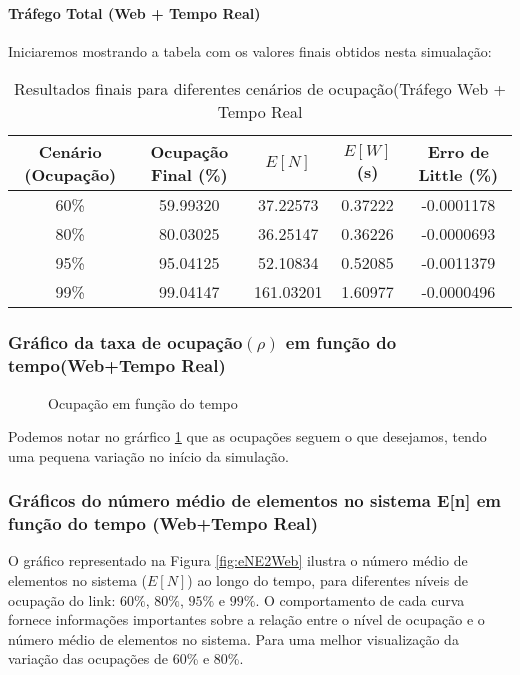 \paragraph{Tráfego Total (Web + Tempo Real)}
Iniciaremos mostrando a tabela com os valores finais obtidos nesta simualação:
\begin{table}[H]
    \centering
    \begin{tabular}{|c|c|c|c|c|}
        \hline
        \textbf{Cenário (Ocupação)} & \textbf{Ocupação Final (\%)} & \textbf{$E[N]$} & \textbf{$E[W]$ (s)} & \textbf{Erro de Little (\%)} \\ 
        \hline
        60\% & 59.99320 & 37.22573  & 0.37222  & -0.0001178 \\ 
        80\% & 80.03025 & 36.25147 & 0.36226 & -0.0000693 \\ 
        95\% & 95.04125 & 52.10834 & 0.52085 & -0.0011379 \\ 
        99\% & 99.04147 & 161.03201 &1.60977 & -0.0000496 \\ 
        \hline
    \end{tabular}
    \caption{Resultados finais para diferentes cenários de ocupação(Tráfego Web + Tempo Real}
    \label{tab:resultados}
\end{table}

\subsubsection{Gráfico da taxa de ocupação$(\rho)$ em função do tempo(Web+Tempo Real)}
\begin{figure}[h!]
   \centering
   
   \caption{Ocupação em função do tempo}
   \label{fig:ocupacaoE2Web}
\end{figure}
Podemos notar no grárfico \ref{fig:ocupacaoE2Web} que as ocupações seguem o que desejamos, tendo uma pequena variação no início da simulação.

\subsubsection{Gráficos do número médio de elementos no sistema E[n] em função do tempo (Web+Tempo Real)}
O gráfico representado na Figura \ref{fig:eNE2Web} ilustra o número médio de elementos no sistema (\(E[N]\)) ao longo do tempo, para diferentes níveis de ocupação do link: \(60\%\), \(80\%\), \(95\%\) e \(99\%\). O comportamento de cada curva fornece informações importantes sobre a relação entre o nível de ocupação e o número médio de elementos no sistema.
Para uma melhor visualização da variação das ocupações de 60\% e 80\%.

